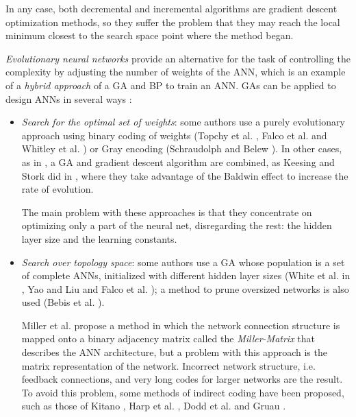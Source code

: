 \documentclass{llncs}
\begin{document}
In any case, both decremental and incremental algorithms are gradient descent optimization methods, so they suffer the problem that they may reach the local minimum closest to the search space point where the method began.

\bigskip

\emph{Evolutionary neural networks} provide an alternative for the task of controlling the complexity by adjusting the number of weights of the ANN, which is an example of a \emph{hybrid approach} of a GA and BP to train an ANN. 
GAs can be applied to design ANNs in several ways \cite{Yao92,Marin95}:

\begin{itemize}
      \item \emph{Search for the optimal set of weights}: some authors use a purely evolutionary approach using binary coding of weights (Topchy et al. \cite{Topchy}, Falco et al. \cite{FalcoPPSN98} and Whitley et al. \cite{Whitley93}) or Gray encoding (Schraudolph and Belew \cite{Schraudolph92}).
In other cases, as in \cite{Castillo1}, a GA and gradient descent algorithm are combined, as Keesing and Stork did in \cite{Keesing}, where they take advantage of the Baldwin effect \cite{Baldwin} to increase the rate of evolution.

\noindent The main problem with these approaches is that they concentrate on optimizing only a part of the neural net, disregarding the rest: the hidden layer size and the learning constants.


      \item \emph{Search over topology space}: some authors use a GA whose population is a set of complete ANNs, initialized with different hidden layer sizes (White et al. in \cite{White}, Yao and Liu \cite{Yao98,Yao98b} and Falco et al. \cite{Falco2}); a method to prune oversized networks is also used (Bebis et al. \cite{Bebis}).

\noindent Miller et al. \cite{Miller} propose a method in which the network connection structure is mapped onto a binary adjacency matrix called the \emph{Miller-Matrix} that describes the ANN architecture, but a problem with this approach is the matrix representation of the network. Incorrect network structure, i.e. feedback connections, and very long codes for larger networks are the result. To avoid this problem, some methods of indirect coding have been proposed, such as those of Kitano \cite{Kitano90b}, Harp et al. \cite{Harp89}, Dodd et al. \cite{Dodd91} and Gruau \cite{Gruau92}.



\end{itemize}
\end{document}
